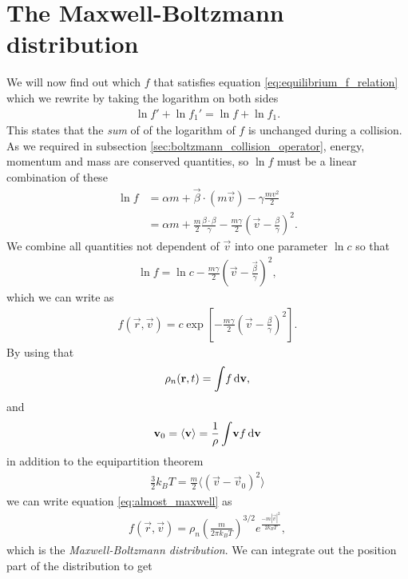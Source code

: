 \section{The Maxwell-Boltzmann distribution}
\label{sec:maxwell_boltzmann_distribution}
We will now find out which $f$ that satisfies equation \eqref{eq:equilibrium_f_relation} which we rewrite by taking the logarithm on both sides
\begin{align}
	\ln f' + \ln f_1' = \ln f + \ln f_1.
\end{align}
This states that the \textit{sum} of of the logarithm of $f$ is unchanged during a collision. As we required in subsection \ref{sec:boltzmann_collision_operator}, energy, momentum and mass are conserved quantities, so $\ln f$ must be a linear combination of these
\begin{align}
	\ln f &= \alpha m + \vec \beta\cdot(m\vec v) - \gamma\frac{mv^2}{2}\\
	&= \alpha m + \frac{m}{2}\frac{\beta\cdot\beta}{\gamma} - \frac{m\gamma}{2}\left(\vec v - \frac{\beta}{\gamma}\right)^2.
\end{align}
We combine all quantities not dependent of $\vec v$ into one parameter $\ln c$ so that
\begin{align}
	\ln f = \ln c - \frac{m\gamma}{2}\left(\vec v - \frac{\vec \beta}{\gamma}\right)^2,
\end{align}
which we can write as
\begin{align}
	\label{eq:almost_maxwell}
	f(\vec r, \vec v) = c\exp\left[-\frac{m\gamma}{2}\left(\vec v - \frac{\beta}{\gamma}\right)^2\right].
\end{align}
By using that 
\begin{align}
	\rho_n(\mathbf r, t) = \int\!f \,\mathrm{d}\mathbf v,
\end{align}
and 
\begin{align}
	\mathbf v_0 = \langle \mathbf v\rangle = \frac{1}{\rho}\int\!\mathbf v f\,\mathrm{d}\mathbf v
\end{align}
in addition to the equipartition theorem
\begin{align}
	\frac{3}{2}k_B T = \frac{m}{2}\langle(\vec v - \vec v_0)^2\rangle
\end{align}
we can write equation \eqref{eq:almost_maxwell} as \cite{mclennan1989introduction}
\begin{align}
	\label{eq:maxwell_boltzmann_distribution}
	f(\vec r, \vec v) = \rho_n \left(\frac{m}{2\pi k_B T}\right)^{3/2}e^\frac{-m|\vec v|^2}{2k_BT},
\end{align}
which is the \textit{Maxwell-Boltzmann distribution}. We can integrate out the position part of the distribution to get
